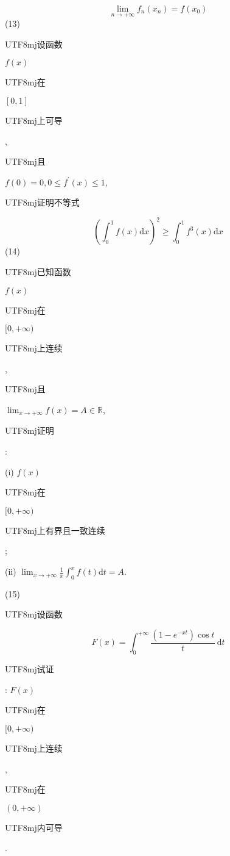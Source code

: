 \documentclass[10pt]{article}
\begin{document}
$$
\lim _{n \rightarrow+\infty} f_{n}\left(x_{n}\right)=f\left(x_{0}\right)
$$
(13) \begin{CJK}{UTF8}{mj}设函数\end{CJK} $f(x)$ \begin{CJK}{UTF8}{mj}在\end{CJK} $[0,1]$ \begin{CJK}{UTF8}{mj}上可导\end{CJK}, \begin{CJK}{UTF8}{mj}且\end{CJK} $f(0)=0,0 \leq f^{\prime}(x) \leq 1$, \begin{CJK}{UTF8}{mj}证明不等式\end{CJK}
$$
\left(\int_{0}^{1} f(x) \mathrm{d} x\right)^{2} \geq \int_{0}^{1} f^{3}(x) \mathrm{d} x
$$
(14) \begin{CJK}{UTF8}{mj}已知函数\end{CJK} $f(x)$ \begin{CJK}{UTF8}{mj}在\end{CJK} $[0,+\infty)$ \begin{CJK}{UTF8}{mj}上连续\end{CJK}, \begin{CJK}{UTF8}{mj}且\end{CJK} $\lim _{x \rightarrow+\infty} f(x)=A \in \mathbb{R}$, \begin{CJK}{UTF8}{mj}证明\end{CJK}:

(i) $f(x)$ \begin{CJK}{UTF8}{mj}在\end{CJK} $[0,+\infty)$ \begin{CJK}{UTF8}{mj}上有界且一致连续\end{CJK};

(ii) $\lim _{x \rightarrow+\infty} \frac{1}{x} \int_{0}^{x} f(t) \mathrm{d} t=A$.

(15) \begin{CJK}{UTF8}{mj}设函数\end{CJK}
$$
F(x)=\int_{0}^{+\infty} \frac{\left(1-e^{-x t}\right) \cos t}{t} \mathrm{~d} t
$$
\begin{CJK}{UTF8}{mj}试证\end{CJK}: $F(x)$ \begin{CJK}{UTF8}{mj}在\end{CJK} $[0,+\infty)$ \begin{CJK}{UTF8}{mj}上连续\end{CJK}, \begin{CJK}{UTF8}{mj}在\end{CJK} $(0,+\infty)$ \begin{CJK}{UTF8}{mj}内可导\end{CJK}.
\end{document}
